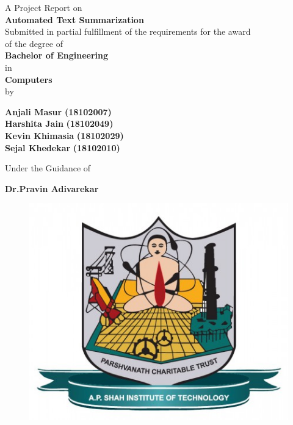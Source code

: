\begin{titlepage}
\vspace*{0.25cm}
{\centering
A Project Report on\\
\vspace{0.5cm}
{\Large\textbf {Automated Text Summarization}}\\
\vspace{1cm}
 Submitted in partial fulfillment of the requirements for the award\\
of the degree of\\ \vspace{1cm}
{\large\textbf {Bachelor of Engineering}}\\
\vspace{0.5cm}
in \\
\vspace{0.5cm}
{\large\textbf {Computers}}\\
\vspace{1cm}
by\\
\vspace{0.5cm}

{\large \textbf {Anjali Masur}\textbf { (18102007)}}\\
{\large \textbf {Harshita Jain}\textbf { (18102049)}}\\
{\large \textbf {Kevin Khimasia}\textbf { (18102029)}}\\
{\large \textbf {Sejal Khedekar}\textbf { (18102010)}}\\

\vspace{1cm}

Under the Guidance of\\ 
\vspace{0.3cm}

\hspace{.05cm} {\large \textbf {Dr.Pravin Adivarekar }}\\
\vspace{1cm}
\begin{figure}[h]
\centering
\includegraphics[scale=0.30]{apsit_logo.jpg}
\end{figure}

}
\end{titlepage}
